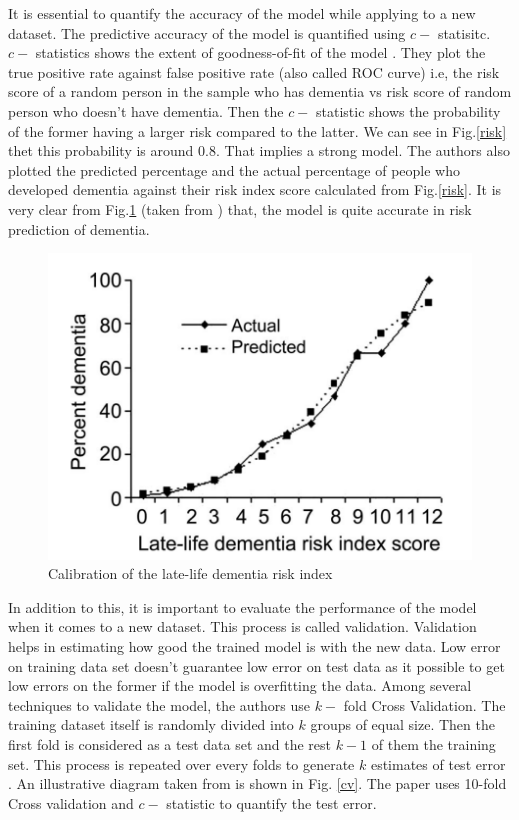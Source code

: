 \documentclass[12pt,letterpaper]{article}
\begin{document}
It is essential to quantify the accuracy of the model while applying to a new dataset. The predictive accuracy of the model is quantified using $c-$ statisitc. $c-$ statistics shows the extent of goodness-of-fit of the model \cite{cstat}. They plot the true positive rate against false positive rate (also called ROC curve) i.e, the risk score of a random person in the sample who has dementia vs risk score of random person who doesn't have dementia. Then the $c-$ statistic shows the probability of the former having a larger risk compared to the latter. We can see in Fig.\ref{risk} thet this probability is around 0.8. That implies a strong model. The authors also plotted the predicted percentage and the actual percentage of people who developed dementia against their risk index score calculated from Fig.\ref{risk}. It is very clear from Fig.\ref{plotrisk} (taken from \cite{barnes2009}) that, the model is quite accurate in risk prediction of dementia.  \\
\begin{figure}
\vspace{-10 mm}
\includegraphics[width=8.2 cm]{riskplot.png}
\caption{Calibration of the late-life dementia risk index}
\label{plotrisk}
\end{figure}
In addition to this, it is important to evaluate the performance of the model when it comes to a new dataset. This process is called validation. Validation helps in estimating how good the trained model is with the new data. Low error on training data set doesn't guarantee low error on test data as it possible to get low errors on the former if the model is overfitting the data. Among several techniques to validate the model, the authors use $k-$ fold Cross Validation. The training dataset itself is randomly divided into $k$ groups of equal size. Then the first fold is considered as a test data set and the rest $k-1$ of them the training set. This process is repeated over every folds to generate $k$ estimates of test error \cite{intro2013}. An illustrative diagram taken from \cite{intro2013} is shown in Fig. \ref{cv}. The paper uses 10-fold Cross validation and $c-$ statistic to quantify the test error.
\end{document}
